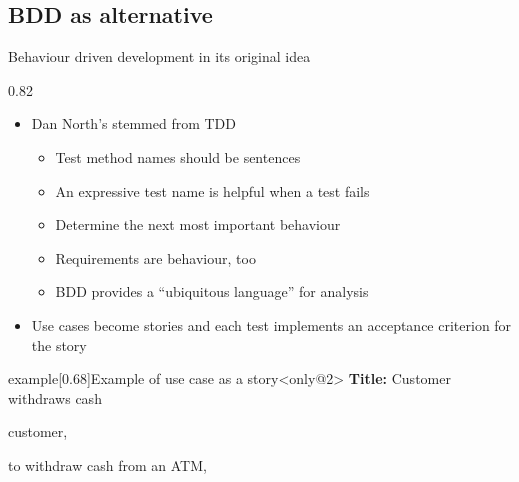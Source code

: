 \subsection{BDD as alternative}
\begin{frame}{Behaviour driven development in its original idea}
    \begin{overlayarea}{\textwidth}{0.82\textheight}
        \begin{itemize}
            \item Dan North's  stemmed from TDD
            \begin{itemize}[<only@1>]
                \item Test method names should be sentences
                \item An expressive test name is helpful when a test fails
                \item Determine the next most important behaviour
                \item Requirements are behaviour, too
                \item BDD provides a ``ubiquitous language'' for analysis
            \end{itemize}
            \item<2-> Use cases become stories and each test implements an acceptance criterion for the story
        \end{itemize}
        \vspace{-2mm}
        \setlength{\labelsep}{\fontdimen2\font} %
        \begin{varblock}{example}[0.68\textwidth]{Example of use case as a story}<only@2>
            \textbf{Title:} Customer withdraws cash\\
            \begin{description}[~~so that]
                \setlength{\itemsep}{0pt}
                \item[\alert{As a}] customer,\\
                \item[\alert{I want}] to withdraw cash from an ATM,\\

\end{description}
\end{varblock}
\end{overlayarea}
\end{frame}
